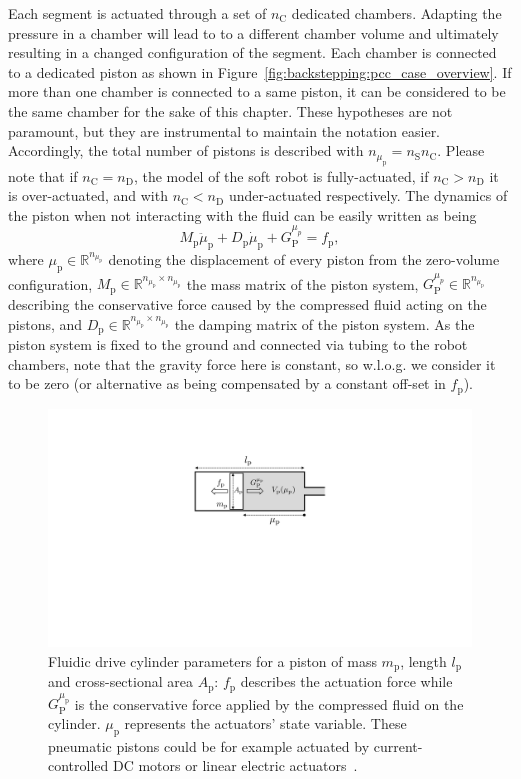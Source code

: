 %
Each segment is actuated through a set of $n_{\mathrm{C}}$ dedicated chambers.
%
Adapting the pressure in a chamber will lead to to a different chamber volume and ultimately resulting in a changed configuration of the segment.
%
Each chamber is connected to a dedicated piston as shown in Figure~\ref{fig:backstepping:pcc_case_overview}. If more than one chamber is connected to a same piston, it can be considered to be the same chamber for the sake of this chapter.
%
These hypotheses are not paramount, but they are instrumental to maintain the notation easier.
%
Accordingly, the total number of pistons is described with $n_{\mu_\mathrm{p}} = n_{\mathrm{S}} n_{\mathrm{C}}$.
%
Please note that if $n_\mathrm{C} = n_\mathrm{D}$, the model of the soft robot is fully-actuated, if $n_\mathrm{C} > n_\mathrm{D}$ it is over-actuated, and with $n_\mathrm{C} < n_\mathrm{D}$ under-actuated respectively.
%
The dynamics of the piston when not interacting with the fluid can be easily written as being
%
\begin{equation}
M_\mathrm{p} \ddot{\mu}_\mathrm{p} + D_\mathrm{p} \dot{\mu}_\mathrm{p} + G_{\mathrm{P}}^{\mu_p} = f_\mathrm{p},
\end{equation}
%
where $\mu_\mathrm{p} \in \mathbb{R}^{n_{\mu_\mathrm{p}}}$ denoting the displacement of every piston from the zero-volume configuration, $M_\mathrm{p} \in \mathbb{R}^{n_{\mu_\mathrm{p}} \times n_{\mu_\mathrm{p}}}$ the mass matrix of the piston system, $G_{\mathrm{P}}^{\mu_p} \in \mathbb{R}^{n_{\mu_\mathrm{p}}}$ describing the conservative force caused by the compressed fluid acting on the pistons, and $D_\mathrm{p} \in \mathbb{R}^{n_{\mu_\mathrm{p}} \times n_{\mu_\mathrm{p}}}$ the damping matrix of the piston system. 
As the piston system is fixed to the ground and connected via tubing to the robot chambers, note that the gravity force here is constant, so w.l.o.g. we consider it to be zero (or alternative as being compensated by a constant off\--set in $f_\mathrm{p}$).

\begin{figure}[ht]
  \centering
  \includegraphics[width=0.5\columnwidth]{backstepping/figures/backstepping_graphics_fluidic_drive_cylinder_v4.pdf}
  \caption{Fluidic drive cylinder parameters for a piston of mass $m_\mathrm{p}$, length $l_\mathrm{p}$ and cross-sectional area $A_\mathrm{p}$: $f_\mathrm{p}$ describes the actuation force while $G_\mathrm{P}^{\mu_\mathrm{p}}$ is the conservative force applied by the compressed fluid on the cylinder. $\mu_\mathrm{p}$ represents the actuators' state variable. These pneumatic pistons could be for example actuated by current-controlled DC motors or linear electric actuators~\cite{marchese2014design}.}\label{fig:backstepping:fluidic_drive_cylinder}
\end{figure}

